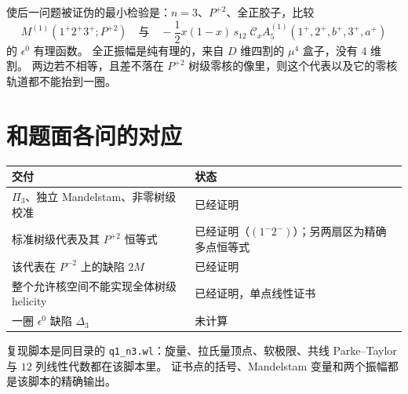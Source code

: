 \documentclass[11pt]{ctexart}
\numberwithin{equation}{section}
\theoremstyle{definition}
\theoremstyle{remark}
\newcommand{\cA}{\mathcal C_x}
\begin{document}
使后一问题被证伪的最小检验是：$n=3$、$P^{+2}$、全正胶子，比较
\[
M^{(1)}(1^+2^+3^+;P^{+2})
\quad\text{与}\quad
-\frac12 x(1-x)\,s_{12}\;
\cA A^{(1)}_5(1^+,2^+,b^+,3^+,a^+)
\]
的 $\epsilon^0$ 有理函数。
全正振幅是纯有理的，来自 $D$ 维四割的 $\mu^4$ 盒子，没有 $4$ 维割。
两边若不相等，且差不落在 $P^{+2}$ 树级零核的像里，则这个代表以及它的零核轨道都不能抬到一圈。

\section{和题面各问的对应}
\begin{center}
\begin{tabular}{@{}ll@{}}
\toprule
交付 & 状态 \\
\midrule
$\Pi_3$、独立 Mandelstam、非零树级校准 & 已经证明 \\
标准树级代表及其 $P^{+2}$ 恒等式 & 已经证明（$(1^-2^-)$）；另两扇区为精确多点恒等式 \\
该代表在 $P^{-2}$ 上的缺陷 $2M$ & 已经证明 \\
整个允许核空间不能实现全体树级 helicity & 已经证明，单点线性证书 \\
一圈 $\epsilon^0$ 缺陷 $\Delta_3$ & 未计算 \\
\bottomrule
\end{tabular}
\end{center}

复现脚本是同目录的 \texttt{q1\_n3.wl}：旋量、拉氏量顶点、软极限、共线 Parke--Taylor 与 $12$ 列线性代数都在该脚本里。
证书点的括号、Mandelstam 变量和两个振幅都是该脚本的精确输出。
\end{document}
